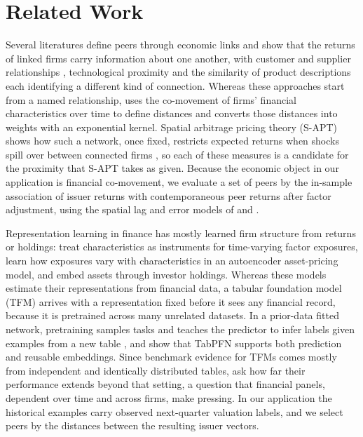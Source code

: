 \section{Related Work}

Several literatures define peers through economic links and show that the
returns of linked firms carry information about one another, with customer
and supplier relationships \citep{cohen2008}, technological proximity
\citep{lee2019technological} and the similarity of product descriptions
\citep{hoberg2016} each identifying a different kind of connection. Whereas
these approaches start from a named relationship, \citet{fernandez2011}
uses the co-movement of firms' financial characteristics over time to
define distances and converts those distances into weights with an
exponential kernel. Spatial arbitrage pricing theory (S-APT) shows how such
a network, once fixed, restricts expected returns when shocks spill over
between connected firms \citep{kou2018}, so each of these measures is a
candidate for the proximity that S-APT takes as given. Because the
economic object in our
application is financial co-movement, we evaluate a set of peers by the
in-sample association of issuer returns with contemporaneous peer returns
after factor adjustment, using the spatial lag and error models of
\citet{anselin1988} and \citet{lesage2009}.

Representation learning in finance has mostly learned firm structure from
returns or holdings: \citet{kelly2019} treat characteristics as
instruments for time-varying factor exposures, \citet{gu2021} learn how
exposures vary with characteristics in an autoencoder asset-pricing model,
and \citet{gabaix2025asset} embed assets through investor holdings.
Whereas these models estimate their representations from financial data,
a tabular foundation model (TFM) arrives with a representation fixed before
it sees any financial record, because it is pretrained across many
unrelated datasets. In a prior-data fitted network, pretraining samples
tasks and teaches the predictor to infer labels given examples from a new
table \citep{muller2022,nagler2023}, and \citet{hollmann2025} show that
TabPFN supports both prediction and reusable embeddings. Since benchmark
evidence for TFMs comes mostly from independent and identically
distributed tables, \citet{purucker2026} ask how far their performance
extends beyond that setting, a question that financial panels, dependent
over time and across firms, make pressing. In our application the
historical examples carry observed next-quarter valuation labels, and we
select peers by the distances between the resulting issuer vectors.

